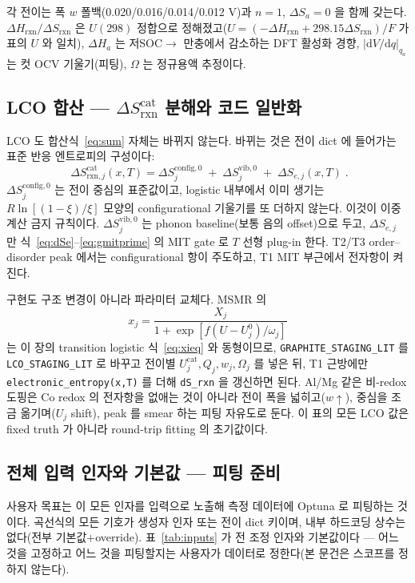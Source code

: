 \documentclass[11pt,a4paper]{article}
\newcommand{\dd}{\mathrm{d}}
\newcommand{\rxn}{\mathrm{rxn}}
\newcommand{\cat}{\mathrm{cat}}
\newcommand{\code}[1]{\texttt{#1}}
\begin{document}
각 전이는 폭 $w$ 폴백(0.020/0.016/0.014/0.012 V)과 $n=1$, $\Delta S_a=0$ 을 함께 갖는다. $\Delta H_\rxn/\Delta S_\rxn$
은 $U(298)$ 정합으로 정해졌고($U=(-\Delta H_\rxn+298.15\Delta S_\rxn)/F$ 가 표의 $U$ 와 일치), $\Delta H_a$ 는 저SOC$\to$
만충에서 감소하는 DFT 활성화 경향, $|\dd V/\dd q|_{q_a}$ 는 컷 OCV 기울기(피팅), $\Omega$ 는 정규용액 추정이다.

\subsection{LCO 합산 — $\Delta S^\cat_{\rxn}$ 분해와 코드 일반화}
LCO 도 합산식~\eqref{eq:sum} 자체는 바뀌지 않는다. 바뀌는 것은 전이 dict 에 들어가는 표준 반응 엔트로피의 구성이다:
\begin{equation}
\boxed{\;\Delta S_{\rxn,j}^\cat(x,T)=
\Delta S_{j}^{\mathrm{config},0}
\;+\;\Delta S_{j}^{\mathrm{vib},0}
\;+\;\Delta S_{e,j}(x,T)\;.}
\label{eq:lco_dS_decomp}
\end{equation}
$\Delta S_{j}^{\mathrm{config},0}$ 는 전이 중심의 표준값이고, logistic 내부에서 이미 생기는
$R\ln[(1-\xi)/\xi]$ 모양의 configurational 기울기를 또 더하지 않는다. 이것이 이중계산 금지 규칙이다.
$\Delta S_{j}^{\mathrm{vib},0}$ 는 phonon baseline(보통 음의 offset)으로 두고, $\Delta S_{e,j}$ 만
식~\eqref{eq:dSe}--\eqref{eq:gmitprime} 의 MIT gate 로 $T$ 선형 plug-in 한다. T2/T3 order--disorder peak 에서는
configurational 항이 주도하고, T1 MIT 부근에서 전자항이 켜진다.

구현도 구조 변경이 아니라 파라미터 교체다. MSMR 의
\[
x_j=\frac{X_j}{1+\exp[f(U-U_j^0)/\omega_j]}
\]
는 이 장의 transition logistic 식~\eqref{eq:xieq} 와 동형이므로, \code{GRAPHITE\_STAGING\_LIT} 를
\code{LCO\_STAGING\_LIT} 로 바꾸고 전이별 $U_j^\cat,Q_j,w_j,\Omega_j$ 를 넣은 뒤, T1 근방에만
\code{electronic\_entropy(x,T)} 를 더해 \code{dS\_rxn} 을 갱신하면 된다. Al/Mg 같은 비-redox 도핑은 Co redox 의
전자항을 없애는 것이 아니라 전이 폭을 넓히고($w\uparrow$), 중심을 조금 옮기며($U_j$ shift), peak 를 smear 하는
피팅 자유도로 둔다. 이 표의 모든 LCO 값은 fixed truth 가 아니라 round-trip fitting 의 초기값이다.

\subsection{전체 입력 인자와 기본값 — 피팅 준비}
사용자 목표는 이 모든 인자를 입력으로 노출해 측정 데이터에 Optuna 로 피팅하는 것이다. 곡선식의 모든 기호가 생성자 인자
또는 전이 dict 키이며, 내부 하드코딩 상수는 없다(전부 기본값$+$override). 표~\ref{tab:inputs} 가 전 조정 인자와
기본값이다 — 어느 것을 고정하고 어느 것을 피팅할지는 사용자가 데이터로 정한다(본 문건은 스코프를 정하지 않는다).
\end{document}
